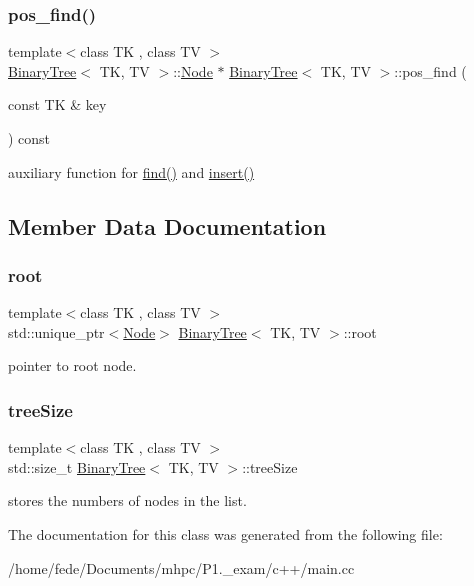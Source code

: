 \subsubsection{\texorpdfstring{pos\_find()}{pos\_find()}}
{\footnotesize\ttfamily template$<$class TK , class TV $>$ \\
\mbox{\hyperlink{classBinaryTree}{Binary\+Tree}}$<$ TK, TV $>$\+::\mbox{\hyperlink{structBinaryTree_1_1Node}{Node}} $\ast$ \mbox{\hyperlink{classBinaryTree}{Binary\+Tree}}$<$ TK, TV $>$\+::pos\+\_\+find (\begin{DoxyParamCaption}\item[{const TK \&}]{key }\end{DoxyParamCaption}) const}

auxiliary function for \mbox{\hyperlink{classBinaryTree_ab7ca7386a799bd4ec8cece3a0e15d7e3}{find()}} and \mbox{\hyperlink{classBinaryTree_a356114cfeed3598a9a37907eafed7b25}{insert()}} 

\subsection{Member Data Documentation}
\mbox{\label{classBinaryTree_a787363fcf3a4109694808f03b3793614}} 
\subsubsection{\texorpdfstring{root}{root}}
{\footnotesize\ttfamily template$<$class TK , class TV $>$ \\
std\+::unique\+\_\+ptr$<$\mbox{\hyperlink{structBinaryTree_1_1Node}{Node}}$>$ \mbox{\hyperlink{classBinaryTree}{Binary\+Tree}}$<$ TK, TV $>$\+::root\hspace{0.3cm}{\ttfamily [private]}}

pointer to root node. \mbox{\label{classBinaryTree_a95c64190503d0c8f5f7878bfb4aaf841}} 
\subsubsection{\texorpdfstring{treeSize}{treeSize}}
{\footnotesize\ttfamily template$<$class TK , class TV $>$ \\
std\+::size\+\_\+t \mbox{\hyperlink{classBinaryTree}{Binary\+Tree}}$<$ TK, TV $>$\+::tree\+Size\hspace{0.3cm}{\ttfamily [private]}}

stores the numbers of nodes in the list. 

The documentation for this class was generated from the following file\+:\begin{DoxyCompactItemize}
\item 
/home/fede/\+Documents/mhpc/\+P1.\+\_\+exam/c++/main.\+cc\end{DoxyCompactItemize}
